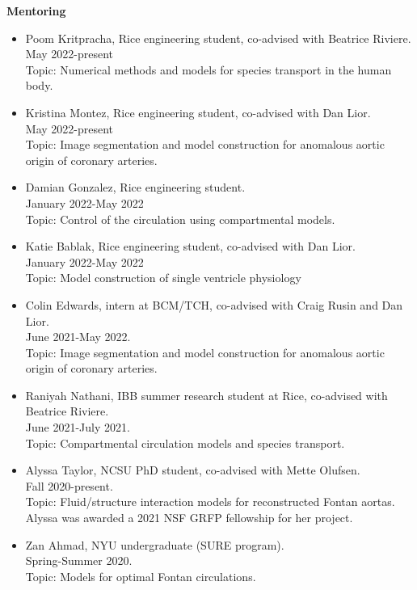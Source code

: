 \documentclass{article} %
\begin{document}
\vspace{0.5cm}
\noindent
{\bf \large Mentoring}
\begin{itemize}
\item Poom Kritpracha, Rice engineering student, co-advised with Beatrice Riviere. \\
May 2022-present \\
Topic: Numerical methods and models for species transport in the human body.
\item Kristina Montez, Rice engineering student, co-advised with Dan Lior. \\
May 2022-present \\
Topic: Image segmentation and model construction for anomalous aortic origin of coronary arteries.
\item Damian Gonzalez, Rice engineering student. \\
January 2022-May 2022 \\
Topic: Control of the circulation using compartmental models.
\item Katie Bablak, Rice engineering student, co-advised with Dan Lior. \\  January 2022-May 2022 \\
Topic: Model construction of single ventricle physiology
\item Colin Edwards, intern at BCM/TCH, co-advised with Craig Rusin and Dan Lior.\\ June 2021-May 2022. \\
Topic: Image segmentation and model construction for anomalous aortic origin of coronary arteries.
\item Raniyah Nathani, IBB summer research student at Rice, co-advised with Beatrice Riviere. \\ June 2021-July 2021. \\
Topic: Compartmental circulation models and species transport.
\item Alyssa Taylor, NCSU PhD student, co-advised with Mette Olufsen.\\ Fall 2020-present. \\
Topic: Fluid/structure interaction models for reconstructed Fontan aortas. \\
Alyssa was awarded a 2021 NSF GRFP fellowship for her project.
\item Zan Ahmad, NYU undergraduate (SURE program). \\Spring-Summer 2020. \\
Topic: Models for optimal Fontan circulations. \\

\end{itemize}
\end{document}
